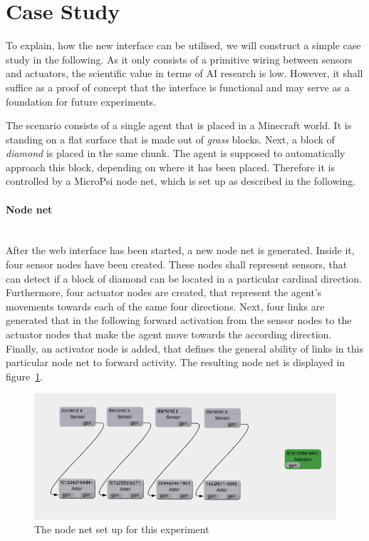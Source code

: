     \section{Case Study}
    \label{case_study}
    



To explain, how the new interface can be utilised, we will construct a simple case study in the following. As it only consists of a primitive wiring between sensors and actuators, the scientific value in terms of AI research is low. However, it shall suffice as a proof of concept that the interface is functional and may serve as a foundation for future experiments.

The scenario consists of a single agent that is placed in a Minecraft world. It is standing on a flat surface that is made out of \emph{grass} blocks. Next, a block of \emph{diamond} is placed in the same chunk. The agent is supposed to automatically approach this block, depending on where it has been placed. Therefore it is controlled by a MicroPsi node net, which is set up as described in the following.

\paragraph{Node net}$\;$ \\

After the web interface has been started, a new node net is generated. Inside it, four sensor nodes have been created. These nodes shall represent sensors, that can detect if a block of diamond can be located in a particular cardinal direction. Furthermore, four actuator nodes are created, that represent the agent's movements towards each of the same four directions. Next, four links are generated that in the following forward activation from the sensor nodes to the actuator nodes that make the agent move towards the according direction. Finally, an activator node is added, that defines the general ability of links in this particular node net to forward activity. The resulting node net is displayed in figure~\ref{nodenet_setup}.

\begin{figure}[h]
  \centering
    \includegraphics[width=14cm]{graphics/nodenet_setup}
  \caption{The node net set up for this experiment}
  \label{nodenet_setup}
\end{figure}

